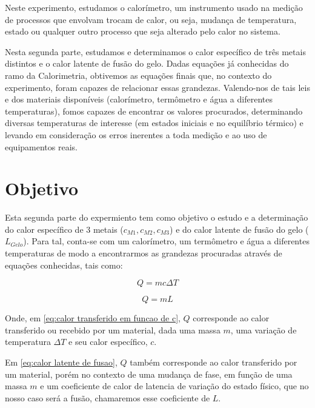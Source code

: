 \documentclass[a4paper]{article}
\begin{document}
		Neste experimento, estudamos o calorímetro, um instrumento usado na
		medição de processos que envolvam trocam de calor, ou seja, mudança
		de temperatura, estado ou qualquer outro processo que seja alterado
		pelo calor no sistema.

		Nesta segunda parte, estudamos e determinamos o calor específico de
		três metais distintos e o calor latente de fusão do gelo. Dadas equações
		já conhecidas do ramo da Calorimetria, obtivemos as equações finais
		que, no contexto do experimento, foram capazes de relacionar essas
		grandezas. Valendo-nos de tais leis e dos materiais disponíveis (calorímetro,
		termômetro e água a diferentes temperaturas), fomos capazes de encontrar
		os valores procurados, determinando diversas temperaturas de interesse
		(em estados iniciais e no equilíbrio térmico) e levando em consideração
		os erros inerentes a toda medição e ao uso de equipamentos reais.


	\section{Objetivo}

		Esta segunda parte do expermiento tem como objetivo o estudo e a determinação
		do calor específico de 3 metais ($c_{M1},c_{M2},c_{M3}$) e do calor
		latente de fusão do gelo ($L_{Gelo}$). Para tal, conta-se com um
		calorímetro, um termômetro e água a diferentes temperaturas de modo
		a encontrarmos as grandezas procuradas através de equações conhecidas,
		tais como:

		\begin{equation}
			Q=mc\Delta T\label{eq:calor transferido em funcao de c}
		\end{equation}


		\begin{equation}
			Q=mL\label{eq:calor latente de fusao}
		\end{equation}


		Onde, em \eqref{eq:calor transferido em funcao de c}, $Q$ corresponde
		ao calor transferido ou recebido por um material, dada uma massa $m$,
		uma variação de temperatura $\Delta T$ e seu calor específico, $c$.

		Em \eqref{eq:calor latente de fusao}, $Q$ também
		corresponde ao calor transferido por um material, porém no contexto
		de uma mudança de fase, em função de uma massa $m$ e um coeficiente
		de calor de latencia de variação do estado físico, que no nosso caso
		será a fusão, chamaremos esse coeficiente de $L$.
\end{document}
